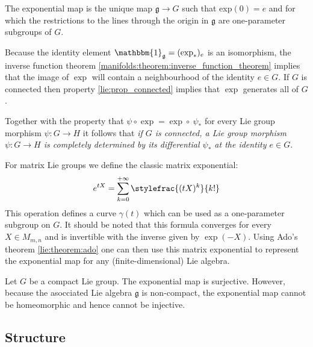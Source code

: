 	\begin{property}
		The exponential map is the unique map $\mathfrak{g}\rightarrow G$ such that exp$(0) = e$ and for which the restrictions to the lines through the origin in $\mathfrak{g}$ are one-parameter subgroups of $G$.
	\end{property}
	\begin{result}\label{lie:exp_result}
		Because the identity element $\mathbbm{1}_\mathfrak{g} = (\exp_\ast)_e$ is an isomorphism, the inverse function theorem \ref{manifolds:theorem:inverse_function_theorem} implies that the image of $\exp$ will contain a neighbourhood of the identity $e\in G$. If $G$ is connected then property \ref{lie:prop_connected} implies that $\exp$ generates all of $G$.
		
		Together with the property that $\psi\circ\exp = \exp\circ\ \psi_\ast$ for every Lie group morphism $\psi:G\rightarrow H$ it follows that \textit{if $G$ is connected, a Lie group morphism $\psi:G\rightarrow H$ is completely determined by its differential $\psi_\ast$ at the identity $e\in G$}.
	\end{result}
	
	\begin{example}
		For matrix Lie groups we define the classic matrix exponential:
		\begin{gather}
			e^{tX} = \sum_{k=0}^{+\infty}\stylefrac{(tX)^k}{k!}
		\end{gather}
		This operation defines a curve $\gamma(t)$ which can be used as a one-parameter subgroup on $G$. It should be noted that this formula converges for every $X\in M_{m,n}$ and is invertible with the inverse given by $\exp(-X)$. Using Ado's theorem \ref{lie:theorem:ado} one can then use this matrix exponential to represent the exponential map for any (finite-dimensional) Lie algebra.
	\end{example}
	
	\begin{property}
		Let $G$ be a compact Lie group. The exponential map is surjective. However, because the asocciated Lie algebra $\mathfrak{g}$ is non-compact, the exponential map cannot be homeomorphic and hence cannot be injective.
	\end{property}

\subsection{Structure}  
        
